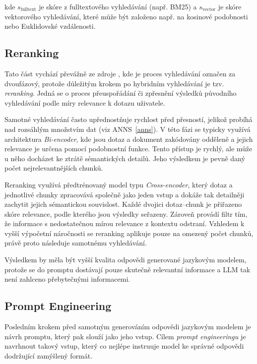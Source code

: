kde $s_{\text{fulltext}}$ je skóre z fulltextového vyhledávání (např. BM25) a $s_{\text{vector}}$ je skóre vektorového vyhledávání, které může být založeno např. na kosinové podobnosti nebo Euklidovské vzdálenosti.

\subsection{Reranking}
Tato část vychází převážně ze zdroje \cite{reranking}, kde je proces vyhledávání označen za dvoufázový, protože důležitým krokem po hybridním vyhledávání je tzv. \textit{reranking}. Jedná se o proces přeuspořádání či zpřesnění výsledků původního vyhledávání podle míry relevance k dotazu uživatele.

Samotné vyhledávání často upřednostňuje rychlost před přesností, jelikož probíhá nad rozsáhlým množstvím dat (viz ANNS~\ref{anns}). V této fázi se typicky využívá architektura \textit{Bi-encoder}, kde jsou dotaz a dokument zakódovány odděleně a jejich relevance je určena pomocí podobnostní funkce. Tento přístup je rychlý, ale může u něho docházet ke ztrátě sémantických detailů. Jeho výsledkem je pevně daný počet nejrelevantnějších chunků.

Reranking využívá předtrénovaný model typu \textit{Cross-encoder}, který dotaz a jednotlivé chunky zpracovává společně jako jeden vstup a dokáže tak detailněji zachytit jejich sémantickou souvislost. Každé dvojici dotaz–chunk je přiřazeno skóre relevance, podle kterého jsou výsledky seřazeny. Zároveň provádí filtr tím, že informace s nedostatečnou mírou relevance z kontextu odstraní. Vzhledem k vyšší výpočetní náročnosti se reranking aplikuje pouze na omezený počet chunků, právě proto následuje samotnému vyhledávání.

Výsledkem by měla být vyšší kvalita odpovědi generované jazykovým modelem, protože se do promptu dostávají pouze skutečně relevantní informace a LLM tak není zahlceno přebytečnými informacemi.

\subsection{Prompt Engineering}
Posledním krokem před samotným generováním odpovědi jazykovým modelem je návrh promptu, který pak slouží jako jeho vstup. Cílem \textit{prompt engineeringu} je navrhnout takový vstup, který co nejlépe instruuje model ke správné odpovědi dodržující zamýšlený formát.

